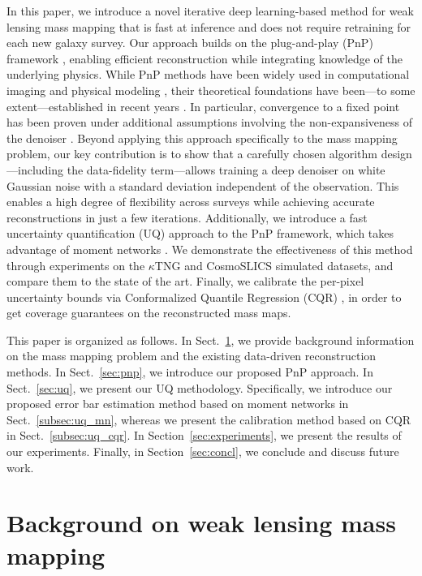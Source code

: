\documentclass{aa}
\begin{document}
In this paper, we introduce a novel iterative deep learning-based method for weak lensing mass mapping that is fast at inference and does not require retraining for each new galaxy survey. Our approach builds on the plug-and-play (PnP) framework \citep{Venkatakrishnan2013}, enabling efficient reconstruction while integrating knowledge of the underlying physics. While PnP methods have been widely used in computational imaging and physical modeling \citep{Kamilov2023}, their theoretical foundations have been---to some extent---established in recent years \citep{Ryu2019,Terris2020,Hurault2022,Ebner2024}. In particular, convergence to a fixed point has been proven under additional assumptions involving the non-expansiveness of the denoiser \tocheck. Beyond applying this approach specifically to the mass mapping problem, our key contribution is to show that a carefully chosen algorithm design---including the data-fidelity term---allows training a deep denoiser on white Gaussian noise with a standard deviation independent of the observation. This enables a high degree of flexibility across surveys while achieving accurate reconstructions in just a few iterations. Additionally, we introduce a fast uncertainty quantification (UQ) approach to the PnP framework, which takes advantage of moment networks \citep{Jeffrey2020a}. We demonstrate the effectiveness of this method through experiments on the $\kappa$TNG \citep{Osato2021} and CosmoSLICS \citep{Harnois-Deraps2019} simulated datasets, and compare them to the state of the art. Finally, we calibrate the per-pixel uncertainty bounds via Conformalized Quantile Regression (CQR) \citep{Romano2019}, in order to get coverage guarantees on the reconstructed mass maps.

This paper is organized as follows. In Sect.~\ref{sec:background}, we provide background information on the mass mapping problem and the existing data-driven reconstruction methods. In Sect.~\ref{sec:pnp}, we introduce our proposed PnP approach. In Sect.~\ref{sec:uq}, we present our UQ methodology. Specifically, we introduce our proposed error bar estimation method based on moment networks in Sect.~\ref{subsec:uq_mn}, whereas we present the calibration method based on CQR in Sect.~\ref{subsec:uq_cqr}. In Section~\ref{sec:experiments}, we present the results of our experiments. Finally, in Section~\ref{sec:concl}, we conclude and discuss future work.

\section{Background on weak lensing mass mapping}
\label{sec:background}
\end{document}
